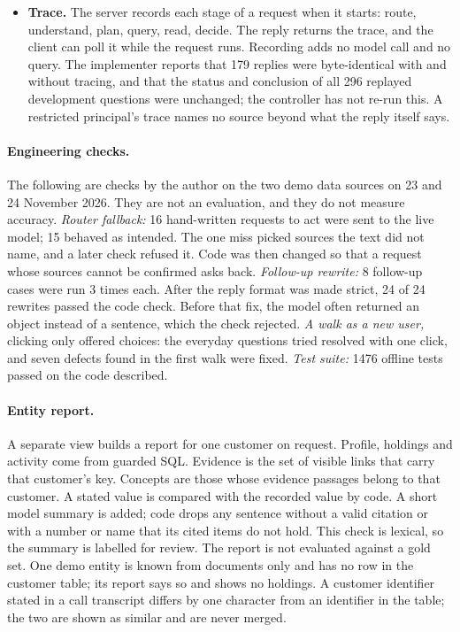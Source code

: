 \documentclass[11pt,a4paper]{article}
\begin{document}
\begin{itemize}[nosep]
\item \textbf{Trace.} The server records each stage of a request when it starts: route, understand, plan, query, read, decide. The reply returns the trace, and the client can poll it while the request runs. Recording adds no model call and no query. The implementer reports that 179 replies were byte-identical with and without tracing, and that the status and conclusion of all 296 replayed development questions were unchanged; the controller has not re-run this. A restricted principal's trace names no source beyond what the reply itself says. %
\end{itemize}

\paragraph{Engineering checks.} The following are checks by the author on the two demo data sources on 23 and 24 November 2026. They are not an evaluation, and they do not measure accuracy. \emph{Router fallback:} 16 hand-written requests to act were sent to the live model; 15 behaved as intended. The one miss picked sources the text did not name, and a later check refused it. Code was then changed so that a request whose sources cannot be confirmed asks back. \emph{Follow-up rewrite:} 8 follow-up cases were run 3 times each. After the reply format was made strict, 24 of 24 rewrites passed the code check. Before that fix, the model often returned an object instead of a sentence, which the check rejected. \emph{A walk as a new user,} clicking only offered choices: the everyday questions tried resolved with one click, and seven defects found in the first walk were fixed. \emph{Test suite:} 1476 offline tests passed on the code described. %

\paragraph{Entity report.} A separate view builds a report for one customer on request. Profile, holdings and activity come from guarded SQL. Evidence is the set of visible links that carry that customer's key. Concepts are those whose evidence passages belong to that customer. A stated value is compared with the recorded value by code. A short model summary is added; code drops any sentence without a valid citation or with a number or name that its cited items do not hold. This check is lexical, so the summary is labelled for review. The report is not evaluated against a gold set. One demo entity is known from documents only and has no row in the customer table; its report says so and shows no holdings. A customer identifier stated in a call transcript differs by one character from an identifier in the table; the two are shown as similar and are never merged. %
\end{document}
